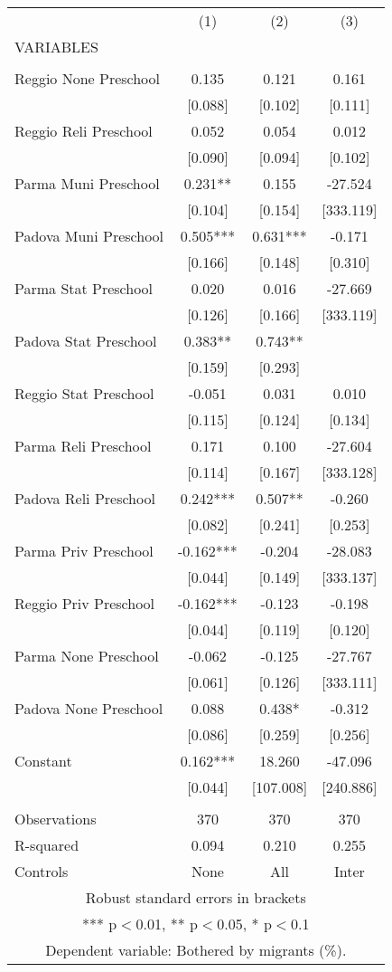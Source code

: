 \begin{tabular}{lccc} \hline
 & (1) & (2) & (3) \\
VARIABLES &  &  &  \\ \hline
 &  &  &  \\
Reggio None Preschool & 0.135 & 0.121 & 0.161 \\
 & [0.088] & [0.102] & [0.111] \\
Reggio Reli Preschool & 0.052 & 0.054 & 0.012 \\
 & [0.090] & [0.094] & [0.102] \\
Parma Muni Preschool & 0.231** & 0.155 & -27.524 \\
 & [0.104] & [0.154] & [333.119] \\
Padova Muni Preschool & 0.505*** & 0.631*** & -0.171 \\
 & [0.166] & [0.148] & [0.310] \\
Parma Stat Preschool & 0.020 & 0.016 & -27.669 \\
 & [0.126] & [0.166] & [333.119] \\
Padova Stat Preschool & 0.383** & 0.743** &  \\
 & [0.159] & [0.293] &  \\
Reggio Stat Preschool & -0.051 & 0.031 & 0.010 \\
 & [0.115] & [0.124] & [0.134] \\
Parma Reli Preschool & 0.171 & 0.100 & -27.604 \\
 & [0.114] & [0.167] & [333.128] \\
Padova Reli Preschool & 0.242*** & 0.507** & -0.260 \\
 & [0.082] & [0.241] & [0.253] \\
Parma Priv Preschool & -0.162*** & -0.204 & -28.083 \\
 & [0.044] & [0.149] & [333.137] \\
Reggio Priv Preschool & -0.162*** & -0.123 & -0.198 \\
 & [0.044] & [0.119] & [0.120] \\
Parma None Preschool & -0.062 & -0.125 & -27.767 \\
 & [0.061] & [0.126] & [333.111] \\
Padova None Preschool & 0.088 & 0.438* & -0.312 \\
 & [0.086] & [0.259] & [0.256] \\
Constant & 0.162*** & 18.260 & -47.096 \\
 & [0.044] & [107.008] & [240.886] \\
 &  &  &  \\
Observations & 370 & 370 & 370 \\
R-squared & 0.094 & 0.210 & 0.255 \\
 Controls & None & All & Inter \\ \hline
\multicolumn{4}{c}{ Robust standard errors in brackets} \\
\multicolumn{4}{c}{ *** p$<$0.01, ** p$<$0.05, * p$<$0.1} \\
\multicolumn{4}{c}{ Dependent variable: Bothered by migrants (\%).} \\
\end{tabular}
